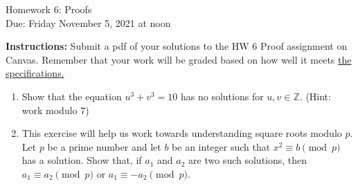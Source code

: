 \documentclass[10pt,a4paper]{article}
\newcommand{\Z}{\mathbb{Z}}
\begin{document}
\begin{center}
{\Large Homework 6: Proofs}\\
Due: Friday November 5, 2021 at noon\\


\end{center}
{\bf Instructions:} Submit a pdf of your solutions to the HW 6 Proof assignment on Canvas. Remember that your work will be graded based on how well it meets \href{https://docs.google.com/document/d/1emM06_WRh_h941rsjtRE9fRVndJtfRKd9gyS3Fs_rFA/edit?usp=sharing}{the specifications. }

\begin{enumerate}
\item Show that the equation $u^3+v^3=10$ has no solutions for $u,v\in \Z$. (Hint: work modulo 7)

\item This exercise will help us work towards understanding square roots modulo $p$.  Let $p$ be a prime number and let $b$ be an integer such that $x^2\equiv b\pmod{p}$ has a solution.  Show that,  if $a_1$ and $a_2$ are two such solutions, then $a_1\equiv a_2\pmod{p}$ or $a_1\equiv -a_2\pmod{p}$. 

\end{enumerate}
\end{document}
